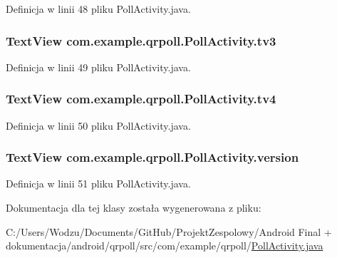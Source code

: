 Definicja w linii 48 pliku Poll\+Activity.\+java.

\hypertarget{classcom_1_1example_1_1qrpoll_1_1_poll_activity_a70708751ea7eb8a32569447a087471b8}{
\subsubsection[{tv3}]{\setlength{\rightskip}{0pt plus 5cm}Text\+View com.\+example.\+qrpoll.\+Poll\+Activity.\+tv3\hspace{0.3cm}{\ttfamily [private]}}}\label{classcom_1_1example_1_1qrpoll_1_1_poll_activity_a70708751ea7eb8a32569447a087471b8}


Definicja w linii 49 pliku Poll\+Activity.\+java.

\hypertarget{classcom_1_1example_1_1qrpoll_1_1_poll_activity_a32c7797e7d6cdf269f9449cfdb635438}{
\subsubsection[{tv4}]{\setlength{\rightskip}{0pt plus 5cm}Text\+View com.\+example.\+qrpoll.\+Poll\+Activity.\+tv4\hspace{0.3cm}{\ttfamily [private]}}}\label{classcom_1_1example_1_1qrpoll_1_1_poll_activity_a32c7797e7d6cdf269f9449cfdb635438}


Definicja w linii 50 pliku Poll\+Activity.\+java.

\hypertarget{classcom_1_1example_1_1qrpoll_1_1_poll_activity_a4fbbfc95809c5aa0bf9916316730a992}{
\subsubsection[{version}]{\setlength{\rightskip}{0pt plus 5cm}Text\+View com.\+example.\+qrpoll.\+Poll\+Activity.\+version\hspace{0.3cm}{\ttfamily [private]}}}\label{classcom_1_1example_1_1qrpoll_1_1_poll_activity_a4fbbfc95809c5aa0bf9916316730a992}


Definicja w linii 51 pliku Poll\+Activity.\+java.



Dokumentacja dla tej klasy została wygenerowana z pliku\+:\begin{DoxyCompactItemize}
\item 
C\+:/\+Users/\+Wodzu/\+Documents/\+Git\+Hub/\+Projekt\+Zespolowy/\+Android Final + dokumentacja/android/qrpoll/src/com/example/qrpoll/\hyperlink{_poll_activity_8java}{Poll\+Activity.\+java}\end{DoxyCompactItemize}
